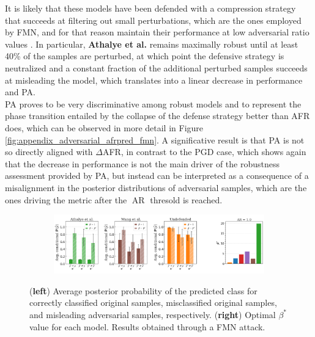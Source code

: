 It is likely that these models have been defended with a
compression strategy that succeeds at filtering out small perturbations, which are
the ones employed by FMN, and for that reason maintain their performance at low
adversarial ratio values \cite{dasKeepingBadGuys2017}.
In particular, {\color{tab:green} \textbf{Athalye et al.}} remains maximally robust
until at least 40\% of the samples are perturbed, at which point the defensive strategy
is neutralized and a constant fraction of the additional perturbed samples succeeds at
misleading the model, which translates into a linear decrease in performance and PA. \\

PA proves to be very discriminative among robust models and to represent the 
phase transition entailed by the collapse of the defense strategy better than AFR does, which can be
observed in more detail in Figure \ref{fig:appendix_adversarial_afrpred_fmn}. A significative
result is that PA is not so directly aligned with $\Delta$AFR, in contrast to
the PGD case, which shows again that the decrease in performance is not the main driver of
the robustness assessment provided by PA, but instead can be interpreted as a consequence of
a misalignment in the posterior distributions of adversarial samples, which are the ones driving
the metric after the $\operatorname{AR}$ thresold is reached. \\

\begin{figure}[H]
    \centering
    \begin{subfigure}[b]{\textwidth}
        \centering
        \includegraphics[width=\textwidth]{img/results_discussion/adversarial/bpda_wang_undefended_beta_fmn.png}
    \end{subfigure}
   
    \caption{(\textbf{left}) Average posterior probability of the predicted class for 
    correctly classified original samples, misclassified original samples, and 
    misleading adversarial samples, respectively. (\textbf{right}) Optimal $\beta^{*}$ value for each model.
    Results obtained through a FMN attack.}
    \label{fig:unrobust_posterior_short_fmn}
\end{figure}

